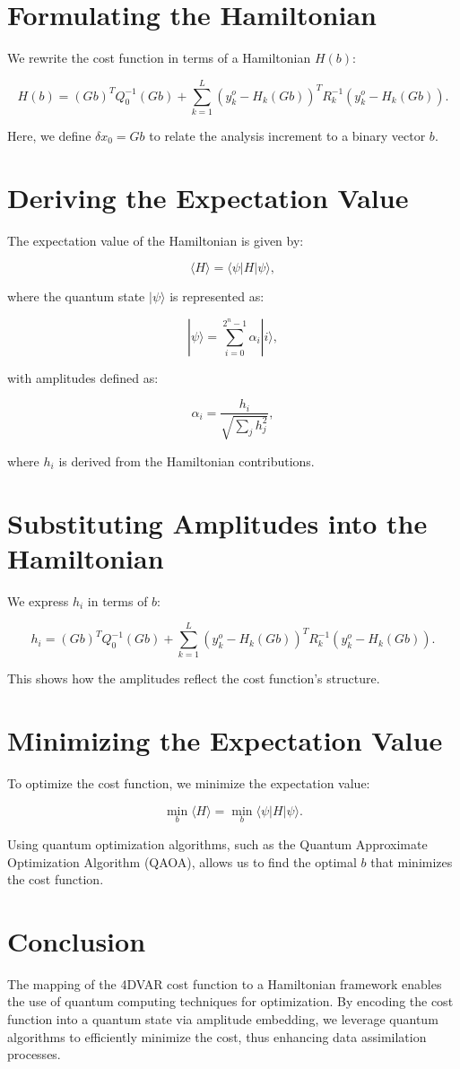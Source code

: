 \documentclass{article}
\begin{document}
\section{Formulating the Hamiltonian}
We rewrite the cost function in terms of a Hamiltonian \( H(b) \):

\[
H(b) = (G b)^T Q_0^{-1} (G b) + \sum_{k=1}^{L} (y_k^o - H_k(G b))^T R_k^{-1} (y_k^o - H_k(G b)).
\]

Here, we define \( \delta x_0 = G b \) to relate the analysis increment to a binary vector \( b \).

\section{Deriving the Expectation Value}
The expectation value of the Hamiltonian is given by:

\[
\langle H \rangle = \langle \psi | H | \psi \rangle,
\]

where the quantum state \( |\psi\rangle \) is represented as:

\[
|\psi\rangle = \sum_{i=0}^{2^n-1} \alpha_i |i\rangle,
\]

with amplitudes defined as:

\[
\alpha_i = \frac{h_i}{\sqrt{\sum_{j} h_j^2}},
\]

where \( h_i \) is derived from the Hamiltonian contributions.

\section{Substituting Amplitudes into the Hamiltonian}
We express \( h_i \) in terms of \( b \):

\[
h_i = (G b)^T Q_0^{-1} (G b) + \sum_{k=1}^{L} (y_k^o - H_k(G b))^T R_k^{-1} (y_k^o - H_k(G b)).
\]

This shows how the amplitudes reflect the cost function's structure.

\section{Minimizing the Expectation Value}
To optimize the cost function, we minimize the expectation value:

\[
\min_b \langle H \rangle = \min_b \langle \psi | H | \psi \rangle.
\]

Using quantum optimization algorithms, such as the Quantum Approximate Optimization Algorithm (QAOA), allows us to find the optimal \( b \) that minimizes the cost function.

\section*{Conclusion}
The mapping of the 4DVAR cost function to a Hamiltonian framework enables the use of quantum computing techniques for optimization. By encoding the cost function into a quantum state via amplitude embedding, we leverage quantum algorithms to efficiently minimize the cost, thus enhancing data assimilation processes.
\end{document}
